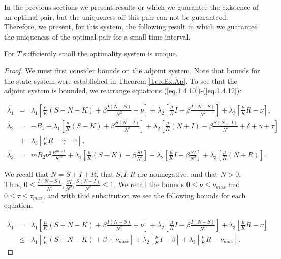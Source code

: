 In the previous sections we present results or which we guarantee the existence 
of an optimal pair, but the uniqueness off this pair can not be guaranteed. 
Therefore, we present, for this system, the following result in which we 
guarantee the uniqueness of the optimal pair for a small time interval.

\begin{theorem}
	For $T$ sufficiently small the optimality system is unique.
\end{theorem}
\begin{proof}
We must first consider bounds on the adjoint system. Note that bounds for the 
state system were established in Theorem	\ref{Teo.Ex.Ap}. To see that the 
adjoint system is bounded, we rearrange equations 
(\ref{eq.1.4.10})-(\ref{eq.1.4.12}):

\begin{eqnarray*}
\dot{\lambda_1}&=& 
\lambda_1\left[\frac{\mu}{K}(S+N-K)+\beta\frac{I(N-S)}{N^2}+\nu\right]+\lambda_2\left[\frac{\mu}{K}I-\beta\frac{I(N-S)}{N^2}\right]+\lambda_3\left[\frac{\mu}{K}R-\nu\right],\\
\dot{\lambda_2}&=& 
-B_1+\lambda_1\left[\frac{\mu}{K}(S-K)+\beta\frac{S(N-I)}{N^2}\right]+\lambda_2\left[\frac{\mu}{K}(N+I)-\beta\frac{S(N-I)}{N^2}+\delta+\gamma+\tau
 \right]\\
&+&\lambda_3\left[\frac{\mu}{K}R-\gamma-\tau\right],\\
\dot{\lambda_3}&=& 
mB_2\nu^2\frac{R^{m-1}}{K^m}+\lambda_1\left[\frac{\mu}{K}(S-K)-\beta\frac{SI}{N^2}\right]+\lambda_2\left[\frac{\mu}{K}I+\beta\frac{SI}{N^2}\right]+\lambda_3\left[\frac{\mu}{K}(N+R)\right].
\end{eqnarray*}

We recall that $N=S+I+R$, that $S,I,R$ are nonnegative, and that $N>0$. Thus, 
$0\leq \frac{I(N-S)}{N^2},\frac{SI}{N^2},\frac{S(N-I)}{N^2}\leq 1$. We recall 
the bounds $0\leq \nu\leq \nu_{max}$ and $0\leq \tau \leq \tau_{max}$, and with 
thid substitution we see the following bounds for each equation:

\begin{eqnarray*}
\dot{\lambda_1}&=& 
\lambda_1\left[\frac{\mu}{K}(S+N-K)+\beta\frac{I(N-S)}{N^2}+\nu\right]+\lambda_2\left[\frac{\mu}{K}I-\beta\frac{I(N-S)}{N^2}\right]+\lambda_3\left[\frac{\mu}{K}R-\nu\right]\\
&\leq& 
\lambda_1\left[\frac{\mu}{K}(S+N-K)+\beta+\nu_{max}\right]+\lambda_2\left[\frac{\mu}{K}I-\beta\right]+\lambda_3\left[\frac{\mu}{K}R-\nu_{max}\right].
\end{eqnarray*}


\end{proof}
